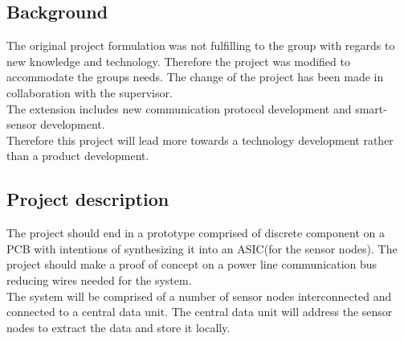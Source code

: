 \subsection{Background}
The original project formulation was not fulfilling to the group with regards to new knowledge and technology. Therefore the project was modified to accommodate the groups needs. The change of the project has been made in collaboration with the supervisor.\\
The extension includes new communication protocol development and smart-sensor development.\\
Therefore this project will lead more towards a technology development rather than a product development.\\

\subsection{Project description}
The project should end in a prototype comprised of discrete component on a PCB with intentions of synthesizing it into an ASIC(for the sensor nodes). The project should make a proof of concept on a power line communication bus reducing wires needed for the system.\\
The system will be comprised of a number of sensor nodes interconnected and connected to a central data unit. The central data unit will address the sensor nodes to extract the data and store it locally.
